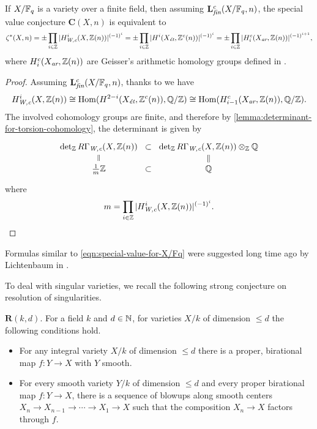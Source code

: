 \documentclass{article}
\numberwithin{equation}{section}
\begin{document}
\begin{proposition}
  \label{prop:C(X,n)-over-finite-fields}
  If $X/\FF_q$ is a variety over a finite field, then assuming
  $\mathbf{L}_\fin^c (X/\FF_q,n)$, the special value conjecture
  $\mathbf{C} (X,n)$ is equivalent to
  \begin{equation}
    \label{eqn:special-value-for-X/Fq}
    \zeta^* (X,n) = \pm \prod_{i \in \ZZ} |H_\Wc^i (X, \ZZ(n))|^{(-1)^i}
    = \pm \prod_{i \in \ZZ} |H^i (X_\et, \ZZ^c (n))|^{(-1)^i}
    = \pm \prod_{i \in \ZZ} |H_i^c (X_\ar, \ZZ (n))|^{(-1)^{i+1}},
  \end{equation}
  where $H_i^c (X_\ar, \ZZ (n))$ are Geisser's arithmetic homology groups
  defined in \cite{Geisser-2010-arithmetic-homology}.

  \begin{proof}
    Assuming $\mathbf{L}_\fin^c (X/\FF_q,n)$, thanks to
    \cite[Proposition~7.9]{Beshenov-Weil-etale-1} we have
    \[ H^i_\Wc (X, \ZZ (n)) \cong
      \Hom (H^{2-i} (X_\et, \ZZ^c (n)), \QQ/\ZZ) \cong
      \Hom (H_{i-1}^c (X_\ar, \ZZ (n)), \QQ/\ZZ). \]
    The involved cohomology groups are finite, and therefore by
    \ref{lemma:determinant-for-torsion-cohomology}, the determinant is given by
    \[ \begin{tikzcd}[row sep=0.75em, column sep=0pt]
        \det_\ZZ R\Gamma_\Wc (X, \ZZ (n)) \ar[equals]{d} & \subset & \det_\ZZ R\Gamma_\Wc (X, \ZZ (n)) \otimes_\ZZ \QQ \ar[equals]{d} \\
        \frac{1}{m}\ZZ & \subset & \QQ
      \end{tikzcd} \]
    where
    \[ m = \prod_{i \in \ZZ} |H_\Wc^i (X, \ZZ(n))|^{(-1)^i}. \qedhere \]
  \end{proof}
\end{proposition}

\begin{remark}
  Formulas similar to \eqref{eqn:special-value-for-X/Fq} were suggested long
  time ago by Lichtenbaum in \cite{Lichtenbaum-1984}.
\end{remark}

To deal with singular varieties, we recall the following strong conjecture on
resolution of singularities.

\begin{conjecture}
  $\mathbf{R} (k,d)$. For a field $k$ and $d \in \NN$, for varieties $X/k$ of
  dimension $\le d$ the following conditions hold.
  \begin{itemize}
  \item For any integral variety $X/k$ of dimension $\le d$ there is a proper,
    birational map $f\colon Y \to X$ with $Y$ smooth.

  \item For every smooth variety $Y/k$ of dimension $\le d$ and every proper
    birational map $f\colon Y\to X$, there is a sequence of blowups along smooth
    centers
    $X_n \to X_{n-1} \to \cdots \to X_1 \to X$
    such that the composition $X_n \to X$ factors through $f$.
  \end{itemize}
\end{conjecture}
\end{document}

